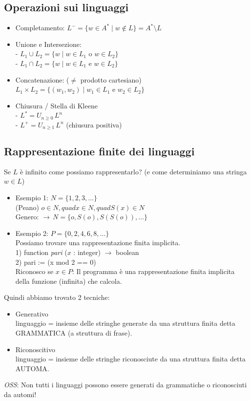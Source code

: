\documentclass[a4paper,12pt]{article}
\begin{document}
\subsection{Operazioni sui linguaggi}
\begin{itemize}
  \item Completamento: $L^- = \{w \in A^* \mid w \notin L \}=A^* \setminus L$ \\
  \item Unione e Intersezione: \\
  - $L_1 \cup L_2 = \{w \mid w \in L_1 \text{ o } w \in L_2 \}$ \\
  - $L_1 \cap L_2 = \{w \mid w \in L_1 \text{ e } w \in L_2 \}$
  \item Concatenazione: ($\neq$ prodotto cartesiano) \\
  $L_1 \times L_2 = \{(w_1,w_2) \mid w_1 \in L_1 \text{ e } w_2 \in L_2\}$
  \item Chiusura / Stella di Kleene \\
  - $L^* = U_{n \geq 0} \, L^n$ \\
  - $L^+ = U_{n \geq 1} \, L^n$ (chiusura positiva)
\end{itemize}
\subsection{Rappresentazione finite dei linguaggi}
Se $L$ è infinito come possiamo rappresentarlo? (e come determiniamo una stringa $w \in L$) \\
\begin{itemize}
  \item Esempio 1: $N=\{1,2,3,\dots\}$ \\
   (Peano) $ o \in N, quad x \in N, quad S(x) \in N$ \\
   Genero: $\to \, N=\{o, S(o), S(S(o)), \dots \}$ 
  \item Esempio 2: $P=\{0,2,4,6,8,\dots \}$ \\
  Possiamo trovare una rappresentazione finita implicita. \\
  1) function \textit{pari} ($x$ : integer) $\to$ boolean \\
  2)   pari := (x mod 2 == 0) \\
  Riconosco se $x \in P$: Il programma è una rappresentazione finita implicita della funzione (infinita) che calcola.
\end{itemize}
Quindi abbiamo trovato 2 tecniche:
\begin{itemize}
  \item Generativo \\
  linguaggio = insieme delle stringhe generate da una struttura finita detta GRAMMATICA (a struttura di frase).
  \item Riconoscitivo \\
  linguaggio = insieme delle stringhe riconosciute da una struttura finita detta AUTOMA.
\end{itemize}
\textit{OSS}: Non tutti i linguaggi possono essere generati da grammatiche o riconosciuti da automi!
\end{document}
